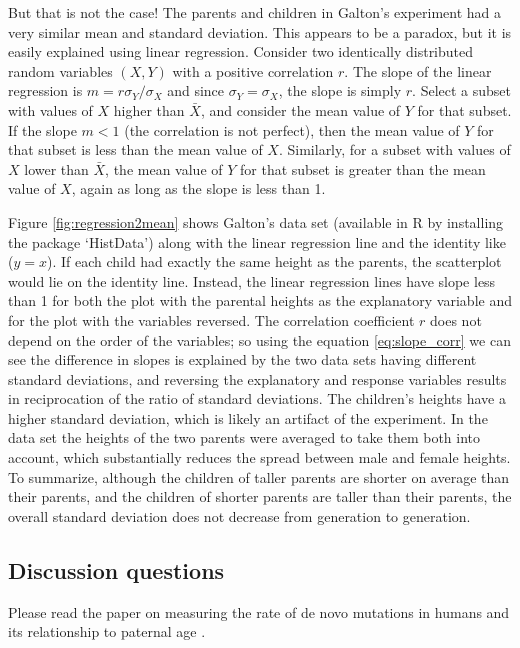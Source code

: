 \documentclass[
  letterpaper,
  DIV=11,
  numbers=noendperiod]{scrreprt}
\begin{document}
But that is not the case! The parents and children in Galton's
experiment had a very similar mean and standard deviation. This appears
to be a paradox, but it is easily explained using linear regression.
Consider two identically distributed random variables \((X,Y)\) with a
positive correlation \(r\). The slope of the linear regression is
\(m = r \sigma_Y/\sigma_X\) and since \(\sigma_Y=\sigma_X\), the slope
is simply \(r\). Select a subset with values of \(X\) higher than
\(\bar X\), and consider the mean value of \(Y\) for that subset. If the
slope \(m<1\) (the correlation is not perfect), then the mean value of
\(Y\) for that subset is less than the mean value of \(X\). Similarly,
for a subset with values of \(X\) lower than \(\bar X\), the mean value
of \(Y\) for that subset is greater than the mean value of \(X\), again
as long as the slope is less than 1.

Figure \ref{fig:regression2mean} shows Galton's data set (available in R
by installing the package `HistData') along with the linear regression
line and the identity like (\(y=x\)). If each child had exactly the same
height as the parents, the scatterplot would lie on the identity line.
Instead, the linear regression lines have slope less than 1 for both the
plot with the parental heights as the explanatory variable and for the
plot with the variables reversed. The correlation coefficient \(r\) does
not depend on the order of the variables; so using the equation
\ref{eq:slope_corr} we can see the difference in slopes is explained by
the two data sets having different standard deviations, and reversing
the explanatory and response variables results in reciprocation of the
ratio of standard deviations. The children's heights have a higher
standard deviation, which is likely an artifact of the experiment. In
the data set the heights of the two parents were averaged to take them
both into account, which substantially reduces the spread between male
and female heights. To summarize, although the children of taller
parents are shorter on average than their parents, and the children of
shorter parents are taller than their parents, the overall standard
deviation does not decrease from generation to generation.

\hypertarget{discussion-questions-1}{%
\subsection{Discussion questions}\label{discussion-questions-1}}

Please read the paper on measuring the rate of
 de novo mutations in humans and its
relationship to paternal age \cite{kong_rate_2012}.
\end{document}

